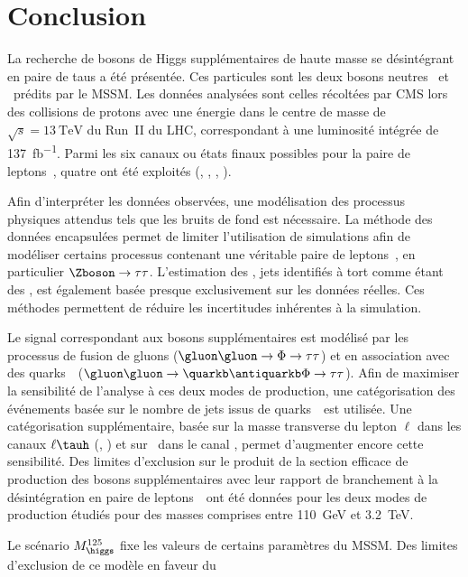 \section{Conclusion}\label{chapter-HTT_analysis-section-conclusion}
La recherche de bosons de Higgs supplémentaires de haute masse se désintégrant en paire de taus
a été présentée.
Ces particules sont les deux bosons neutres \Higgs\ et \HiggsA\ prédits par le MSSM.
Les données analysées sont celles récoltées par CMS
lors des collisions de protons avec une énergie dans le centre de masse de $\sqrt{s}=\SI{13}{\TeV}$ du Run~II du LHC,
correspondant à une luminosité intégrée de \SI{137}{\femto\barn^{-1}}.
Parmi les six canaux ou états finaux possibles pour la paire de leptons~\tau,
quatre ont été exploités (\tauh\tauh, \mu\tauh, \ele\tauh, \ele\mu).
\par
Afin d'interpréter les données observées,
une modélisation des processus physiques attendus tels que les bruits de fond
est nécessaire.
La méthode des données encapsulées permet de limiter l'utilisation de simulations afin de modéliser
certains processus contenant une véritable paire de leptons~\tau,
en particulier $\Zboson\to\tau\tau$.
L'estimation des \ftauhs, jets identifiés à tort comme étant des \tauh,
est également basée presque exclusivement sur les données réelles.
Ces méthodes permettent de réduire les incertitudes inhérentes à la simulation.
\par
Le signal correspondant aux bosons supplémentaires est modélisé par les processus
de fusion de gluons ($\gluon\gluon\to\Phi\to\tau\tau$)
et
en association avec des quarks~\quarkb\ ($\gluon\gluon\to\quarkb\antiquarkb\Phi\to\tau\tau$).
Afin de maximiser la sensibilité de l'analyse à ces deux modes de production,
une catégorisation des événements basée sur le nombre de jets issus de quarks~\quarkb\
est utilisée.
Une catégorisation supplémentaire, basée sur la masse transverse du lepton $\ell$ dans les canaux $\ell\tauh$ (\mu\tauh, \ele\tauh) et sur \Dzeta\ dans le canal \ele\mu, permet d'augmenter encore cette sensibilité.
Des limites d'exclusion sur le produit de la section efficace de production des bosons supplémentaires avec leur rapport de branchement à la désintégration en paire de leptons~\tau\ ont été données pour les deux modes de production étudiés pour des masses comprises entre \SI{110}{\GeV} et \SI{3.2}{\TeV}.
\par
Le scénario $M_{\higgs}^{125}$
fixe les valeurs de certains paramètres du MSSM.
Des limites d'exclusion de ce modèle
en faveur du \SM\
